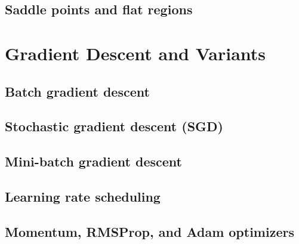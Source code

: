 \subsection{Saddle points and flat regions}

\section{Gradient Descent and Variants}
\subsection{Batch gradient descent}
\subsection{Stochastic gradient descent (SGD)}
\subsection{Mini-batch gradient descent}
\subsection{Learning rate scheduling}
\subsection{Momentum, RMSProp, and Adam optimizers}